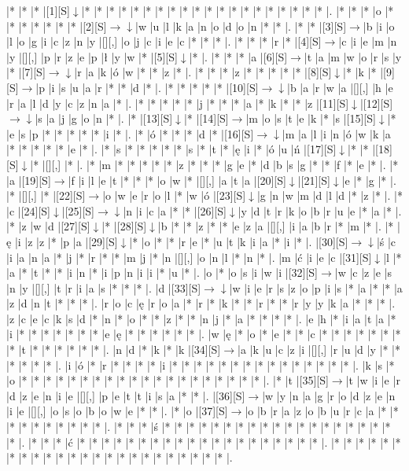 \documentclass[11pt]{article}
\newcommand\drarr{$\rightarrow \!\!\!\!\! \downarrow$}
\newcommand\rarr{$\rightarrow$}
\newcommand\darr{$\downarrow$}
\begin{document}
\noindent\begin{Puzzle}{23}{33}|*	|*	|*	|[1][S]\darr	|*	|*	|*	|*	|*	|*	|*	|*	|*	|*	|*	|*	|*	|*	|*	|*	|*	|*	|*	|*	|.
|*	|*	|*	|o	|*	|*	|*	|*	|*	|*	|*	|[2][S]\drarr	|w	|u	|l	|k	|a	|n	|o	|d	|o	|n	|*	|*	|.
|*	|*	|[3][S]\rarr	|b	|i	|o	|l	|o	|g	|i	|c	|z	|n	|y	|[][,]{ }	|o	|j	|c	|i	|e	|c	|*	|*	|*	|.
|*	|*	|*	|r	|*	|[4][S]\rarr	|c	|i	|e	|m	|n	|y	|[][,]{ }	|p	|r	|z	|e	|p	|ł	|y	|w	|*	|[5][S]\darr	|*	|.
|*	|*	|*	|a	|[6][S]\rarr	|t	|a	|m	|w	|o	|r	|s	|y	|*	|[7][S]\drarr	|r	|a	|k	|ó	|w	|*	|*	|z	|*	|.
|*	|*	|*	|z	|*	|*	|*	|*	|*	|[8][S]\darr	|*	|k	|*	|[9][S]\rarr	|p	|i	|s	|u	|a	|r	|*	|*	|d	|*	|.
|*	|*	|*	|*	|*	|[10][S]\drarr	|b	|a	|r	|w	|a	|[][,]{ }	|h	|e	|r	|a	|l	|d	|y	|c	|z	|n	|a	|*	|.
|*	|*	|*	|*	|*	|j	|*	|*	|*	|a	|*	|k	|*	|*	|z	|[11][S]\darr	|[12][S]\drarr	|s	|a	|j	|g	|o	|n	|*	|.
|*	|[13][S]\darr	|*	|[14][S]\rarr	|m	|o	|s	|t	|e	|k	|*	|s	|[15][S]\darr	|*	|e	|s	|p	|*	|*	|*	|*	|*	|i	|*	|.
|*	|ó	|*	|*	|*	|d	|*	|[16][S]\drarr	|m	|a	|l	|i	|n	|ó	|w	|k	|a	|*	|*	|*	|*	|*	|e	|*	|.
|*	|s	|*	|*	|*	|*	|*	|s	|*	|t	|*	|ę	|i	|*	|ó	|u	|ń	|[17][S]\darr	|*	|*	|[18][S]\darr	|*	|[][,]{ }	|*	|.
|*	|m	|*	|*	|*	|*	|*	|z	|*	|*	|*	|g	|e	|*	|d	|b	|s	|g	|*	|*	|f	|*	|e	|*	|.
|*	|a	|[19][S]\rarr	|f	|i	|l	|e	|t	|*	|*	|*	|o	|w	|*	|[][,]{ }	|a	|t	|a	|[20][S]\darr	|[21][S]\darr	|e	|*	|g	|*	|.
|*	|[][,]{ }	|*	|[22][S]\rarr	|o	|w	|e	|r	|o	|l	|*	|w	|ó	|[23][S]\darr	|g	|n	|w	|m	|d	|l	|d	|*	|z	|*	|.
|*	|c	|[24][S]\darr	|[25][S]\drarr	|n	|i	|c	|a	|*	|*	|[26][S]\darr	|y	|d	|t	|r	|k	|o	|b	|r	|u	|e	|*	|a	|*	|.
|*	|z	|w	|d	|[27][S]\darr	|*	|[28][S]\darr	|b	|*	|*	|z	|*	|*	|e	|z	|a	|[][,]{ }	|i	|a	|b	|r	|*	|m	|*	|.
|*	|ę	|i	|z	|z	|*	|p	|a	|[29][S]\darr	|*	|o	|*	|*	|r	|e	|*	|u	|t	|k	|i	|a	|*	|i	|*	|.
|[30][S]\drarr	|ś	|c	|i	|a	|n	|a	|*	|j	|*	|r	|*	|*	|m	|j	|*	|n	|[][,]{ }	|o	|n	|l	|*	|n	|*	|.
|m	|ć	|i	|e	|c	|[31][S]\darr	|l	|*	|a	|*	|t	|*	|*	|i	|n	|*	|i	|p	|n	|i	|i	|*	|u	|*	|.
|o	|*	|o	|s	|i	|w	|i	|[32][S]\rarr	|w	|c	|z	|e	|s	|n	|y	|[][,]{ }	|t	|r	|i	|a	|s	|*	|*	|*	|.
|d	|[33][S]\drarr	|w	|i	|e	|r	|s	|z	|o	|p	|i	|s	|*	|a	|*	|*	|a	|z	|d	|n	|t	|*	|*	|*	|.
|r	|o	|c	|ę	|r	|o	|a	|*	|r	|*	|k	|*	|*	|r	|*	|*	|r	|y	|y	|k	|a	|*	|*	|*	|.
|z	|c	|e	|c	|k	|s	|d	|*	|n	|*	|o	|*	|*	|z	|*	|*	|n	|j	|*	|a	|*	|*	|*	|*	|.
|e	|h	|*	|i	|a	|t	|a	|*	|i	|*	|*	|*	|*	|*	|*	|*	|e	|ę	|*	|*	|*	|*	|*	|*	|.
|w	|ę	|*	|o	|*	|e	|*	|*	|c	|*	|*	|*	|*	|*	|*	|*	|*	|t	|*	|*	|*	|*	|*	|*	|.
|n	|d	|*	|k	|*	|k	|[34][S]\rarr	|a	|k	|u	|c	|z	|i	|[][,]{ }	|r	|u	|d	|y	|*	|*	|*	|*	|*	|*	|.
|i	|ó	|*	|r	|*	|*	|*	|*	|i	|*	|*	|*	|*	|*	|*	|*	|*	|*	|*	|*	|*	|*	|*	|*	|.
|k	|s	|*	|o	|*	|*	|*	|*	|*	|*	|*	|*	|*	|*	|*	|*	|*	|*	|*	|*	|*	|*	|*	|*	|.
|*	|t	|[35][S]\rarr	|t	|w	|i	|e	|r	|d	|z	|e	|n	|i	|e	|[][,]{ }	|p	|e	|t	|t	|i	|s	|a	|*	|*	|.
|[36][S]\rarr	|w	|y	|n	|a	|g	|r	|o	|d	|z	|e	|n	|i	|e	|[][,]{ }	|o	|s	|o	|b	|o	|w	|e	|*	|*	|.
|*	|o	|[37][S]\rarr	|o	|b	|r	|a	|z	|o	|b	|u	|r	|c	|a	|*	|*	|*	|*	|*	|*	|*	|*	|*	|*	|.
|*	|*	|*	|ś	|*	|*	|*	|*	|*	|*	|*	|*	|*	|*	|*	|*	|*	|*	|*	|*	|*	|*	|*	|*	|.
|*	|*	|*	|ć	|*	|*	|*	|*	|*	|*	|*	|*	|*	|*	|*	|*	|*	|*	|*	|*	|*	|*	|*	|*	|.
|*	|*	|*	|*	|*	|*	|*	|*	|*	|*	|*	|*	|*	|*	|*	|*	|*	|*	|*	|*	|*	|*	|*	|*	|.\end{Puzzle}
\end{document}

